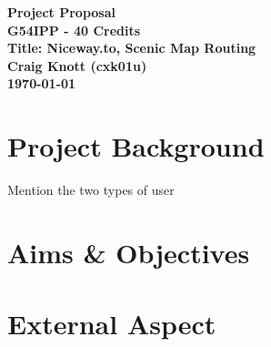 \documentclass[a4paper,twoside,notitlepage,11pt]{article}
\begin{document}
\pagestyle{empty}
\begin{center}
 {\LARGE \textbf{Project Proposal} \\ [0.2cm]}
 \textbf{G54IPP - 40 Credits}\\
   \textbf{Title: Niceway.to, Scenic Map Routing}\\
    \textbf{Craig Knott (cxk01u)} \\
	 \textbf{\today}
\end{center}

\section{Project Background}

{\color{red}
	Mention the two types of user
}

\section{Aims \& Objectives}
\section{External Aspect}
\end{document}
